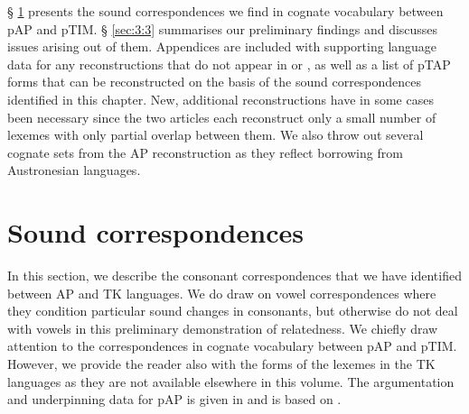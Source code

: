 {\S} \ref{sec:3:2} presents the sound correspondences we find in cognate vocabulary between pAP and pTIM. {\S} \ref{sec:3:3} summarises our preliminary findings and discusses issues arising out of them.  Appendices are included with supporting language data for any reconstructions that do not appear in \citet{HoltonEtAl2012} or \citet{SchapperEtAl2012}, as well as a list of pTAP forms that can be reconstructed on the basis of the sound correspondences identified in this chapter. New, additional reconstructions have in some cases been necessary since the two articles each reconstruct only a small number of lexemes with only partial overlap between them. We also throw out several cognate sets from the AP reconstruction as they reflect borrowing from Austronesian languages. 

\section{Sound correspondences}\label{sec:3:2}
In this section, we describe the consonant correspondences that we have identified between AP and TK languages. We do draw on vowel correspondences where they condition particular sound changes in consonants, but otherwise do not deal with vowels in this preliminary demonstration of relatedness. We chiefly draw attention to the correspondences in cognate vocabulary between pAP and pTIM. However, we provide the reader also with the forms of the lexemes in the TK languages as they are not available elsewhere in this volume. The argumentation and underpinning data for pAP is given in \citet{HoltonRobinsonTVhistory} and is based on \citet{HoltonEtAl2012}.

